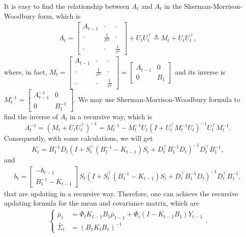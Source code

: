 It is easy to find the relationship between $A_{t}$ and  $A_{t}$ in the Sherman-Morrison-Woodbury form, which is 
\begin{align*} A_{t} = 
\begin{bmatrix}
A_{t-1} & \cdot & \cdot  \\ \cdot &\frac{1}{\sigma^2} &\cdot  \\ \cdot  & \cdot  & \frac{1}{\tau^2} 
\end{bmatrix} + U_{t}U_{t}^\top \triangleq M_{t}  + U_{t}U_{t}^\top,
\end{align*}
where, in fact, $M_{t} = \begin{bmatrix}
A_{t-1} & \cdot & \cdot  \\ \cdot &\frac{1}{\sigma^2} &\cdot  \\ \cdot  & \cdot  & \frac{1}{\tau^2}
\end{bmatrix}  = \begin{bmatrix}
A_{t-1} & 0 \\ 0 & B_1
\end{bmatrix}$ 
and its inverse is $M_{t}^{-1} =\begin{bmatrix}
A_{t-1}^{-1} & 0 \\ 0 & B_1^{-1}
\end{bmatrix}$. We may use Sherman-Morrison-Woodbury formula to find the inverse of $A_{t}$ in a recursive way, which is 
\begin{equation}
A_{t}^{-1} = (M_{t}+U_{t}U_{t}^\top)^{-1}= M_{t}^{-1}-M_{t}^{-1}U_{t}(I+U_{t}^\top M_{t}^{-1}U_{t})^{-1}U_{t}^\top M_{t}^{-1}.
\end{equation}
Consequently, with some calculations, we will get 
\begin{equation}\label{OUupdatingK}
K_{t} =B_1^{-1}D_{t} (I+ S_{t}^\top (B_1^{-1} - K_{t-1})  S_{t} +D_{t}^\top B_1^{-1}D_{t}  )^{-1}  D_{t}^\top B_1^{-1},
\end{equation}
and
\begin{align*}
b_{t} = \begin{bmatrix}
-b_{t-1} \\ B_1^{-1}-K_{t-1} 
\end{bmatrix}  S_{t} (I+ S_{t}^\top (B_1^{-1} - K_{t-1})  S_{t} +D_{t}^\top B_1^{-1}D_{t}  )^{-1} D_{t}^\top B_1^{-1}, 
\end{align*}
that are updating in a recursive way. Therefore, one can achieve the recursive updating formula for the mean and covariance matrix, which are  
\begin{align}
\begin{cases}
\bar{\mu}_{t}&=\Phi_{t} K_{t-1}B_1\bar{\mu}_{t-1} + \Phi_{t} (I-K_{t-1}B_1)Y_{t-1}\\
\bar{\Sigma}_{t}&=\left( B_1K_{t}B_1  \right)^{-1}
\end{cases}.
\end{align}
